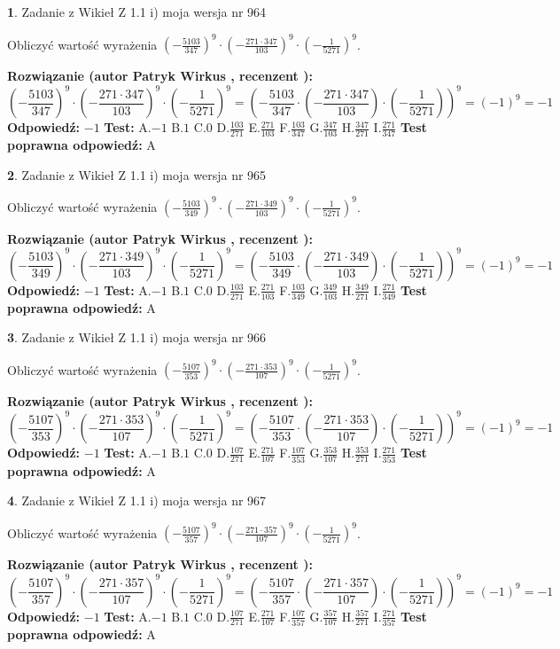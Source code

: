 \documentclass[12pt, a4paper]{article}
\theoremstyle{definition} %
\newtheorem{zad}{}
\newcommand{\zadStart}[1]{\begin{zad}#1\newline}
\newcommand{\zadStop}{\end{zad}}
\newcommand{\rozwStart}[2]{\noindent \textbf{Rozwiązanie (autor #1 , recenzent #2): }\newline}
\newcommand{\rozwStop}{\newline}
\newcommand{\odpStart}{\noindent \textbf{Odpowiedź:}\newline}
\newcommand{\odpStop}{\newline}
\newcommand{\testStart}{\noindent \textbf{Test:}\newline}
\newcommand{\testStop}{\newline}
\newcommand{\kluczStart}{\noindent \textbf{Test poprawna odpowiedź:}\newline}
\newcommand{\kluczStop}{\newline}
\begin{document}
\zadStart{Zadanie z Wikieł Z 1.1 i) moja wersja nr 964}

Obliczyć wartość wyrażenia $(-\frac{5103}{347})^{9} \cdot (-\frac{271 \cdot 347}{103})^{9} \cdot (-\frac{1}{5271})^{9}$.
\zadStop
\rozwStart{Patryk Wirkus}{}
$$(-\frac{5103}{347})^{9} \cdot (-\frac{271 \cdot 347}{103})^{9} \cdot (-\frac{1}{5271})^{9} = (-\frac{5103}{347} \cdot (-\frac{271 \cdot 347}{103}) \cdot (-\frac{1}{5271}))^{9} = (-1)^{9} = -1$$
\rozwStop
\odpStart
$-1$
\odpStop
\testStart
A.$-1$ B.$1$ C.$0$ D.$\frac{103}{271}$ E.$\frac{271}{103}$
F.$\frac{103}{347}$ G.$\frac{347}{103}$
H.$\frac{347}{271}$
I.$\frac{271}{347}$
\testStop
\kluczStart
A
\kluczStop



\zadStart{Zadanie z Wikieł Z 1.1 i) moja wersja nr 965}

Obliczyć wartość wyrażenia $(-\frac{5103}{349})^{9} \cdot (-\frac{271 \cdot 349}{103})^{9} \cdot (-\frac{1}{5271})^{9}$.
\zadStop
\rozwStart{Patryk Wirkus}{}
$$(-\frac{5103}{349})^{9} \cdot (-\frac{271 \cdot 349}{103})^{9} \cdot (-\frac{1}{5271})^{9} = (-\frac{5103}{349} \cdot (-\frac{271 \cdot 349}{103}) \cdot (-\frac{1}{5271}))^{9} = (-1)^{9} = -1$$
\rozwStop
\odpStart
$-1$
\odpStop
\testStart
A.$-1$ B.$1$ C.$0$ D.$\frac{103}{271}$ E.$\frac{271}{103}$
F.$\frac{103}{349}$ G.$\frac{349}{103}$
H.$\frac{349}{271}$
I.$\frac{271}{349}$
\testStop
\kluczStart
A
\kluczStop



\zadStart{Zadanie z Wikieł Z 1.1 i) moja wersja nr 966}

Obliczyć wartość wyrażenia $(-\frac{5107}{353})^{9} \cdot (-\frac{271 \cdot 353}{107})^{9} \cdot (-\frac{1}{5271})^{9}$.
\zadStop
\rozwStart{Patryk Wirkus}{}
$$(-\frac{5107}{353})^{9} \cdot (-\frac{271 \cdot 353}{107})^{9} \cdot (-\frac{1}{5271})^{9} = (-\frac{5107}{353} \cdot (-\frac{271 \cdot 353}{107}) \cdot (-\frac{1}{5271}))^{9} = (-1)^{9} = -1$$
\rozwStop
\odpStart
$-1$
\odpStop
\testStart
A.$-1$ B.$1$ C.$0$ D.$\frac{107}{271}$ E.$\frac{271}{107}$
F.$\frac{107}{353}$ G.$\frac{353}{107}$
H.$\frac{353}{271}$
I.$\frac{271}{353}$
\testStop
\kluczStart
A
\kluczStop



\zadStart{Zadanie z Wikieł Z 1.1 i) moja wersja nr 967}

Obliczyć wartość wyrażenia $(-\frac{5107}{357})^{9} \cdot (-\frac{271 \cdot 357}{107})^{9} \cdot (-\frac{1}{5271})^{9}$.
\zadStop
\rozwStart{Patryk Wirkus}{}
$$(-\frac{5107}{357})^{9} \cdot (-\frac{271 \cdot 357}{107})^{9} \cdot (-\frac{1}{5271})^{9} = (-\frac{5107}{357} \cdot (-\frac{271 \cdot 357}{107}) \cdot (-\frac{1}{5271}))^{9} = (-1)^{9} = -1$$
\rozwStop
\odpStart
$-1$
\odpStop
\testStart
A.$-1$ B.$1$ C.$0$ D.$\frac{107}{271}$ E.$\frac{271}{107}$
F.$\frac{107}{357}$ G.$\frac{357}{107}$
H.$\frac{357}{271}$
I.$\frac{271}{357}$
\testStop
\kluczStart
A
\kluczStop
\end{document}
